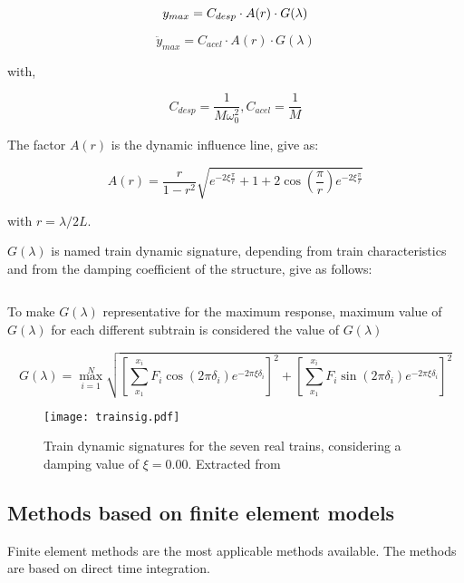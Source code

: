 \begin{equation}
	\centering
	y_{max}=C_{desp}\cdot A(r) \cdot G(\lambda)
\end{equation}

\begin{equation}
	\ddot{y}_{max}=C_{acel}\cdot A(r) \cdot G(\lambda)
\end{equation}

with,

\begin{equation}
	C_{desp} = \frac{1}{M\omega_0^2},
	C_{acel} = \frac{1}{M}
\end{equation}

The factor $ A(r) $ is the dynamic influence line, give as:

\begin{equation}
	A(r)=\frac{r}{1-r^2}\sqrt{e^{-2\xi \frac{\pi}{r}}+1+2\cos (\frac{\pi}{r})e^{-2\xi \frac{\pi}{r}}}
\end{equation}

with $ r=\lambda/2L $.

$G(\lambda)$ is named train dynamic signature, depending from train characteristics and from the damping coefficient of the structure, give as follows:

\begin{equation}
\end{equation}

To make $G(\lambda)$ representative for the maximum response, maximum value of $G(\lambda)$ for each different subtrain is considered the value of $G(\lambda)$

\begin{equation}
	G(\lambda) = \max_{i=1}^{N} \sqrt{[\sum_{x_1}^{x_i}F_i\cos (2\pi \delta_i) e^{-2\pi \xi \delta_i}]^2+[\sum_{x_1}^{x_i}F_i \sin (2\pi \delta_i) e^{-2\pi \xi \delta_i}]^2}
\end{equation}

\begin{figure}[h]
	\centering
	\texttt{[image: trainsig.pdf]}
	\caption{Train dynamic signatures for the seven real trains, considering a damping value of $\xi = 0.00$. Extracted from \cite[Figure 2.20]{da2007dynamic}}
	\label{trainsig}
\end{figure}

\subsection{Methods based on finite element models}
Finite element methods are the most applicable methods available. The methods are based on direct time integration.

